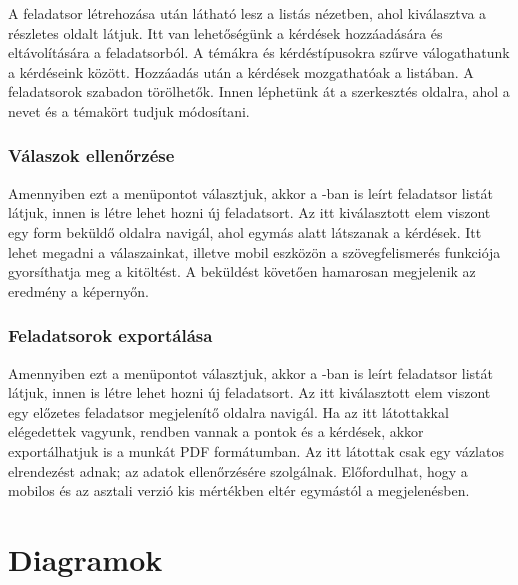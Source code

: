 A feladatsor létrehozása után látható lesz a listás nézetben, ahol kiválasztva a részletes oldalt látjuk.
Itt van lehetőségünk a kérdések hozzáadására és eltávolítására a feladatsorból.
A témákra és kérdéstípusokra szűrve válogathatunk a kérdéseink között.
Hozzáadás után a kérdések mozgathatóak a listában.
A feladatsorok szabadon törölhetők.
Innen léphetünk át a szerkesztés oldalra, ahol a nevet és a témakört tudjuk módosítani.

\subsubsection{Válaszok ellenőrzése}

Amennyiben ezt a menüpontot választjuk, akkor a -ban is leírt feladatsor listát látjuk, innen is létre lehet hozni új feladatsort.
Az itt kiválasztott elem viszont egy form beküldő oldalra navigál, ahol egymás alatt látszanak a kérdések.
Itt lehet megadni a válaszainkat, illetve mobil eszközön a szövegfelismerés funkciója gyorsíthatja meg a kitöltést.
A beküldést követően hamarosan megjelenik az eredmény a képernyőn.

\subsubsection{Feladatsorok exportálása}

Amennyiben ezt a menüpontot választjuk, akkor a -ban is leírt feladatsor listát látjuk, innen is létre lehet hozni új feladatsort.
Az itt kiválasztott elem viszont egy előzetes feladatsor megjelenítő oldalra navigál.
Ha az itt látottakkal elégedettek vagyunk, rendben vannak a pontok és a kérdések, akkor exportálhatjuk is a munkát PDF formátumban.
Az itt látottak csak egy vázlatos elrendezést adnak; az adatok ellenőrzésére szolgálnak.
Előfordulhat, hogy a mobilos és az asztali verzió kis mértékben eltér egymástól a megjelenésben.

\pagebreak

\section{Diagramok}
\label{sec:SepcificationDiagrams}

